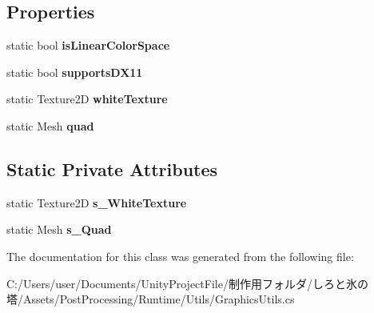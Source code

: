 \subsection*{Properties}
\begin{DoxyCompactItemize}
\item 
\mbox{\label{class_unity_engine_1_1_post_processing_1_1_graphics_utils_a4c516ec56416acd3d25bd56ac5b050e6}} 
static bool {\bfseries is\+Linear\+Color\+Space}
\item 
\mbox{\label{class_unity_engine_1_1_post_processing_1_1_graphics_utils_aa52e38bfebfc8b51a2d8c33de57c9a75}} 
static bool {\bfseries supports\+D\+X11}
\item 
\mbox{\label{class_unity_engine_1_1_post_processing_1_1_graphics_utils_ac3517dcff552180f8d10dab50463518c}} 
static Texture2D {\bfseries white\+Texture}
\item 
\mbox{\label{class_unity_engine_1_1_post_processing_1_1_graphics_utils_abd61c3a628477b875d7e73af470ef03b}} 
static Mesh {\bfseries quad}
\end{DoxyCompactItemize}
\subsection*{Static Private Attributes}
\begin{DoxyCompactItemize}
\item 
\mbox{\label{class_unity_engine_1_1_post_processing_1_1_graphics_utils_a5a77b99429c9f200e21b492c0c83d40b}} 
static Texture2D {\bfseries s\+\_\+\+White\+Texture}
\item 
\mbox{\label{class_unity_engine_1_1_post_processing_1_1_graphics_utils_a7a222765c36ddcfc6548024040d90601}} 
static Mesh {\bfseries s\+\_\+\+Quad}
\end{DoxyCompactItemize}


The documentation for this class was generated from the following file\+:\begin{DoxyCompactItemize}
\item 
C\+:/\+Users/user/\+Documents/\+Unity\+Project\+File/制作用フォルダ/しろと氷の塔/\+Assets/\+Post\+Processing/\+Runtime/\+Utils/Graphics\+Utils.\+cs\end{DoxyCompactItemize}
